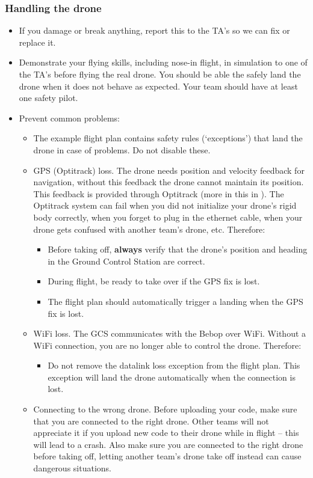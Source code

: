 \subsubsection*{Handling the drone}
\begin{itemize}
	\item If you damage or break anything, report this to the TA's so we can fix or replace it.
	\item Demonstrate your flying skills, including nose-in flight, in simulation to one of the TA's before flying the real drone. You should be able the safely land the drone when it does not behave as expected. Your team should have at least one safety pilot.
	\item Prevent common problems:
	\begin{itemize}
		\item The example flight plan contains safety rules (`exceptions') that land the drone in case of problems. Do not disable these.
		\item GPS (Optitrack) loss. The drone needs position and velocity feedback for navigation, without this feedback the drone cannot maintain its position. This feedback is provided through Optitrack (more in this in ). The Optitrack system can fail when you did not initialize your drone's rigid body correctly, when you forget to plug in the ethernet cable, when your drone gets confused with another team's drone, etc. Therefore:
		\begin{itemize}
			\item Before taking off, \textbf{always} verify that the drone's position and heading in the Ground Control Station are correct.
			\item During flight, be ready to take over if the GPS fix is lost.
			\item The flight plan should automatically trigger a landing when the GPS fix is lost.
		\end{itemize}
		\item WiFi loss. The GCS communicates with the Bebop over WiFi. Without a WiFi connection, you are no longer able to control the drone. Therefore:
		\begin{itemize}
			\item Do not remove the datalink loss exception from the flight plan. This exception will land the drone automatically when the connection is lost.
		\end{itemize}
		\item Connecting to the wrong drone. Before uploading your code, make sure that you are connected to the right drone. Other teams will not appreciate it if you upload new code to their drone while in flight -- this will lead to a crash. Also make sure you are connected to the right drone before taking off, letting another team's drone take off instead can cause dangerous situations.

\end{itemize}
\end{itemize}
